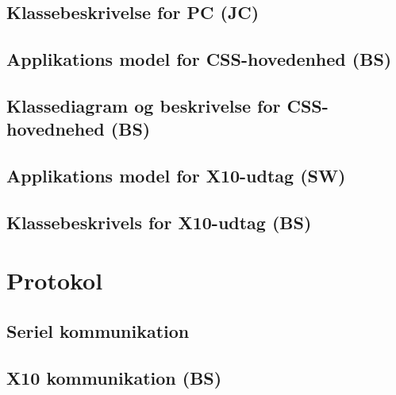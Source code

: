 \subsection{Klassebeskrivelse for PC (JC)}

\newpage

\subsection{Applikations model for CSS-hovedenhed (BS)}

\clearpage

\subsection{Klassediagram og beskrivelse for CSS-hovednehed (BS)}

\newpage

\newpage
\subsection{Applikations model for X10-udtag (SW)}

\clearpage

\subsection{Klassebeskrivels for X10-udtag (BS)}

\newpage

\section{Protokol}

\subsection{Seriel kommunikation}


\subsection{X10 kommunikation (BS)}

\newpage